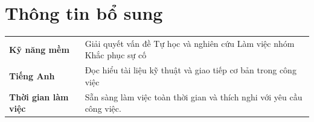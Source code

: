 \documentclass[10pt,a4paper]{article}
\begin{document}

\section*{Thông tin bổ sung}

{\small
\begin{tabularx}{\linewidth}{@{}lX@{}}

\textbf{Kỹ năng mềm}
&
Giải quyết vấn đề \textbar{} Tự học và nghiên cứu \textbar{}
Làm việc nhóm \textbar{} Khắc phục sự cố
\\[1pt]

\textbf{Tiếng Anh}
&
Đọc hiểu tài liệu kỹ thuật và giao tiếp cơ bản trong công việc
\\[1pt]

\textbf{Thời gian làm việc}
&
Sẵn sàng làm việc toàn thời gian và thích nghi với yêu cầu công việc.

\end{tabularx}
}
\end{document}
